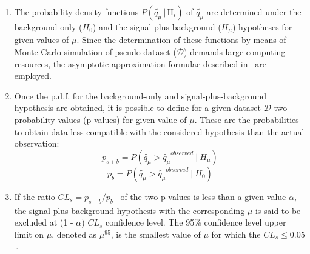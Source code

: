 \begin{enumerate}
%
%
%
	\item The probability density functions $P(\tilde{q_{\mu}} \,| \, \text{H}_i)$ of $\tilde{q_{\mu}}$ are determined  under the background-only ($H_0$) and 
	the  signal-plus-background ($H_{\mu}$) hypotheses for  given values of $\mu$.
	Since the determination of these functions by means of Monte Carlo simulation of pseudo-dataset ($\mathcal{D}$)	demands large computing resources,
	the asymptotic approximation formulae described in~\cite{Asympt} are employed.
	

	\item Once the p.d.f. for the background-only and signal-plus-background hypothesis are obtained, 
	it is possible to define for a given dataset $\mathcal{D}$ two probability values (p-values) for  given value of $\mu$.
	These are the probabilities to obtain data less compatible with the considered hypothesis than the 
	actual observation:
	$$
	p_{s+b} = P(\tilde{q_{\mu}} > \tilde{q_{\mu}}^{observed} ~ | ~ H_{\mu})  
	$$
	$$ 
	p_{b} = P(\tilde{q_{\mu}} > \tilde{q_{\mu}}^{observed} ~ | ~ H_0)
	$$

	\item If the ratio $CL_{s} = p_{s+b} / p_{b}$~\cite{cls1,cls2} of the two p-values is less than a given value $\alpha$,
	the signal-plus-background hypothesis with the corresponding $\mu$ is said to be excluded at  (1 - $\alpha$) $CL_{s}$ confidence level. 
	The 95\% confidence level upper limit on $\mu$,
	denoted as $\mu^{95}$, is  the smallest value of $\mu$ for which the  $CL_{s} \le 0.05$\,.

\end{enumerate}
